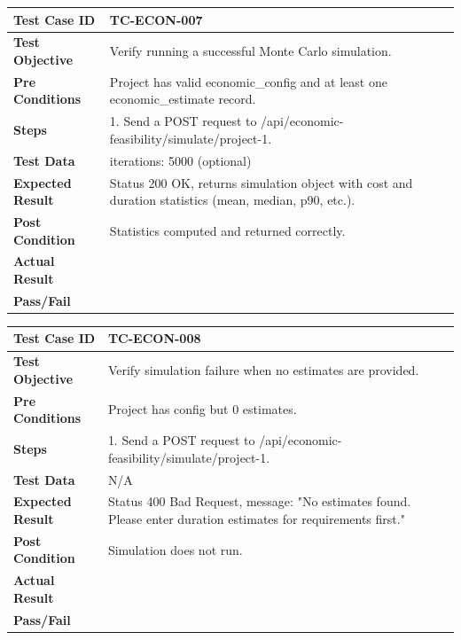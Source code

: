 \begin{longtable}{|p{}|p{}|}
\hline
\textbf{Test Case ID} & TC-ECON-007 \\ \hline
\textbf{Test Objective} & Verify running a successful Monte Carlo simulation. \\ \hline
\textbf{Pre Conditions} & Project has valid economic\_config and at least one economic\_estimate record. \\ \hline
\textbf{Steps} & 
1. Send a POST request to /api/economic-feasibility/simulate/project-1. \\ \hline
\textbf{Test Data} & iterations: 5000 (optional) \\ \hline
\textbf{Expected Result} & Status 200 OK, returns simulation object with cost and duration statistics (mean, median, p90, etc.). \\ \hline
\textbf{Post Condition} & Statistics computed and returned correctly. \\ \hline
\textbf{Actual Result} &  \\ \hline
\textbf{Pass/Fail} &  \\ \hline
\end{longtable}

\begin{longtable}{|p{}|p{}|}
\hline
\textbf{Test Case ID} & TC-ECON-008 \\ \hline
\textbf{Test Objective} & Verify simulation failure when no estimates are provided. \\ \hline
\textbf{Pre Conditions} & Project has config but 0 estimates. \\ \hline
\textbf{Steps} & 
1. Send a POST request to /api/economic-feasibility/simulate/project-1. \\ \hline
\textbf{Test Data} & N/A \\ \hline
\textbf{Expected Result} & Status 400 Bad Request, message: "No estimates found. Please enter duration estimates for requirements first." \\ \hline
\textbf{Post Condition} & Simulation does not run. \\ \hline
\textbf{Actual Result} &  \\ \hline
\textbf{Pass/Fail} &  \\ \hline
\end{longtable}

